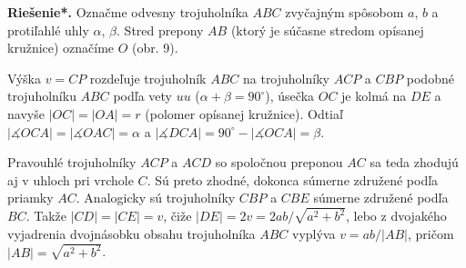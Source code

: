 \documentclass[11pt,a4paper,oneside,final]{book}
\newcommand{\rieh}{\textbf{Riešenie*.} }
\newcommand{\ma}{\measuredangle}
\begin{document}
\rieh Označme odvesny trojuholníka $ABC$ zvyčajným spôsobom $a$, $b$ a protiľahlé uhly $\alpha$, $\beta$. Stred prepony $AB$ (ktorý je súčasne stredom opísanej kružnice) označíme $O$ (obr. 9).

Výška $v = CP$ rozdeľuje trojuholník $ABC$ na trojuholníky $ACP$ a $CBP$ podobné trojuholníku $ABC$ podľa vety $uu$ ($\alpha + \beta = 90^\circ$), úsečka $OC$ je kolmá na $DE$ a navyše $|OC| = |OA| = r$ (polomer opísanej kružnice). Odtiaľ $|\ma OCA| = |\ma OAC| = \alpha$ a $|\ma DCA| = 90^\circ - |\ma OCA| = \beta$.

Pravouhlé trojuholníky $ACP$ a $ACD$ so spoločnou preponou $AC$ sa teda zhodujú aj v uhloch pri vrchole $C$. Sú preto zhodné, dokonca súmerne združené podľa priamky $AC$. Analogicky sú trojuholníky $CBP$ a $CBE$ súmerne združené podľa $BC$. Takže $|CD|= |CE| = v$, čiže $|DE| = 2v = 2ab/\sqrt{a^2 + b^2}$, lebo z dvojakého vyjadrenia dvojnásobku obsahu trojuholníka $ABC$ vyplýva $v = ab/|AB|$, pričom $|AB| =\sqrt{
a^2 + b^2}$.
\end{document}
